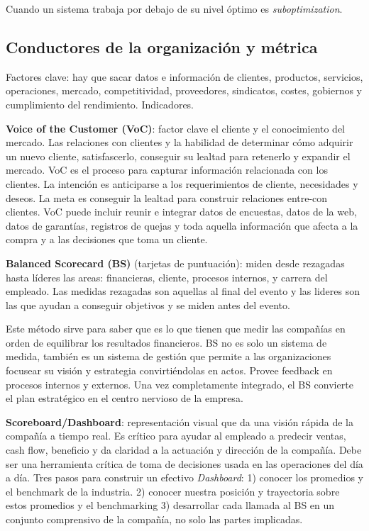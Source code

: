 \documentclass[]{article}
\begin{document}
Cuando un sistema trabaja por debajo de su nivel óptimo es \textit{suboptimization}.

\subsection{Conductores de la organización y métrica}
Factores clave: hay que sacar datos e información de clientes, productos, servicios, operaciones, mercado, competitividad, proveedores, sindicatos, costes, gobiernos y cumplimiento del rendimiento. Indicadores.

\textbf{Voice of the Customer (VoC)}: factor clave el cliente y el conocimiento del mercado. Las relaciones con clientes y la habilidad de determinar cómo adquirir un nuevo cliente, satisfascerlo, conseguir su lealtad para retenerlo y expandir el mercado. VoC es el proceso para capturar información relacionada con los clientes. La intención es anticiparse a los requerimientos de cliente, necesidades y deseos. La meta es conseguir la lealtad para construir relaciones entre-con clientes. VoC puede incluir reunir e integrar datos de encuestas, datos de la web, datos de garantías, registros de quejas y toda aquella información que afecta a la compra y a las decisiones que toma un cliente.

\textbf{Balanced Scorecard (BS)} (tarjetas de puntuación): miden desde rezagadas hasta líderes las areas: financieras, cliente, procesos internos, y carrera del empleado. Las medidas rezagadas son aquellas al final del evento y las lideres son las que ayudan a conseguir objetivos y se miden antes del evento. 

Este método sirve para saber que es lo que tienen que medir las compañías en orden de equilibrar los resultados financieros. 
BS no es solo un sistema de medida, también es un sistema de gestión que permite a las organizaciones focusear su visión y estrategia convirtiéndolas en actos. Provee feedback en procesos internos y externos. Una vez completamente integrado, el BS convierte el plan estratégico en el centro nervioso de la empresa.

\textbf{Scoreboard/Dashboard}: representación visual que da una visión rápida de la compañía a tiempo real. Es crítico para ayudar al empleado a predecir ventas, cash flow, beneficio y da claridad a la actuación y dirección de la compañía. Debe ser una herramienta crítica de toma de decisiones usada en las operaciones del día a día. Tres pasos para construir un efectivo \textit{Dashboard}: 1) conocer los promedios y el benchmark de la industria. 2) conocer nuestra posición y trayectoria sobre estos promedios y el benchmarking 3) desarrollar cada llamada al BS en un conjunto comprensivo de la compañía, no solo las partes implicadas.
\end{document}
